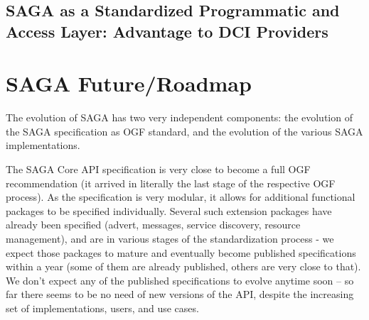 \documentclass[12pt]{article}
\begin{document}
\subsection{SAGA as a Standardized Programmatic and Access Layer:
  Advantage to DCI Providers}




\section{SAGA Future/Roadmap}

 The evolution of SAGA has two very independent components: the
 evolution of the SAGA specification as OGF standard, and the
 evolution of the various SAGA implementations.

 The SAGA Core API specification is very close to become a full OGF
 recommendation (it arrived in literally the last stage of the
 respective OGF process).  As the specification is very modular, it
 allows for additional functional packages to be specified
 individually.  Several such extension packages have already been
 specified (advert, messages, service discovery, resource management),
 and are in various stages of the standardization process - we expect
 those packages to mature and eventually become published
 specifications within a year (some of them are already published,
 others are very close to that).  We don't expect any of the published
 specifications to evolve anytime soon -- so far there seems to be no
 need of new versions of the API, despite the increasing set of
 implementations, users, and use cases.
\end{document}
